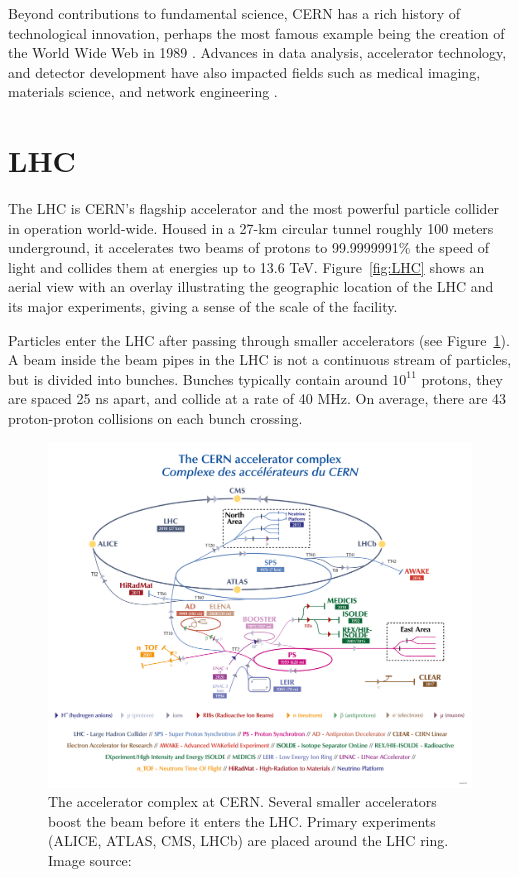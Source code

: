 Beyond contributions to fundamental science, \ac{CERN} has a rich history of technological innovation, perhaps the most famous example being the creation of the World Wide Web in 1989 \cite{www-proposal}. Advances in data analysis, accelerator technology, and detector development have also impacted fields such as medical imaging, materials science, and network engineering \cite{cern-tech-impact}.

\clearpage
\section{\acs{LHC}}
\label{sec:lhc-experiments}

The \ac{LHC} \cite{Lebrun:1284331, Brüning:782076} is \ac{CERN}'s flagship accelerator and the most powerful particle collider in operation world-wide. Housed in a 27-km circular tunnel roughly 100 meters underground, it accelerates two beams of protons to 99.9999991\% the speed of light and collides them at energies up to 13.6 \ac{TeV}. Figure~\ref{fig:LHC} shows an aerial view with an overlay illustrating the geographic location of the LHC and its major experiments, giving a sense of the scale of the facility.

Particles enter the \ac{LHC} after passing through smaller accelerators (see Figure~\ref{fig:cern-complex}). A beam inside the beam pipes in the \ac{LHC} is not a continuous stream of particles, but is divided into bunches. Bunches typically contain around $10^{11}$ protons, they are spaced 25 ns apart, and collide at a rate of 40 MHz. On average, there are 43 proton-proton collisions on each bunch crossing.

\begin{figure}[htbp]
\centering
\includegraphics[width=\textwidth]{images/introduction/cern-experiments.png}
\caption[The accelerator complex at CERN]{The accelerator complex at \acs{CERN}. Several smaller accelerators boost the beam before it enters the \acs{LHC}. Primary experiments (\acs{ALICE}, \acs{ATLAS}, \acs{CMS}, \acs{LHCb}) are placed around the \acs{LHC} ring. Image source: \protect\cite{cern_accelerator_complex}}
\label{fig:cern-complex}
\end{figure}

